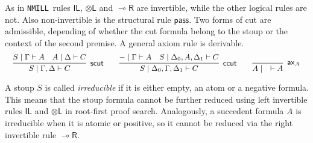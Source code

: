 \documentclass[runningheads]{llncs}
\newcommand{\tl}{\otimes \mathsf{L}}
\newcommand{\lright}{{\multimap}\mathsf{R}}
\newcommand{\pass}{\mathsf{pass}}
\newcommand{\unitl}{\mathsf{IL}}
\newcommand{\otL}{\tl}
\newcommand{\lolliR}{\lright}
\newcommand{\IL}{\unitl}
\newcommand{\ax}{\mathsf{ax}}
\newcommand{\NMILL}{\texttt{NMILL}}
\begin{document}
As in \NMILL\, rules $\IL$, $\otL$ and $\lolliR$ are invertible, while the other logical rules are not. Also non-invertible is the structural rule $\pass$.
Two forms of cut are admissible, depending of whether the cut formula belong to the stoup or the context of the second premise. A general axiom rule is derivable.
\[
\small
    \infer[\mathsf{scut}]{S \mid \Gamma , \Delta \vdash C}{
      S \mid \Gamma \vdash A
      &
      A \mid \Delta \vdash C
    }
    \qquad
    \infer[\mathsf{ccut}]{S \mid \Delta_0 , \Gamma , \Delta_1 \vdash C}{
      - \mid \Gamma \vdash A
      &
      S \mid \Delta_0 , A , \Delta_1 \vdash C
    }
    \qquad
    \infer[\ax_A]{A \mid \quad \vdash A}{}
\]

A stoup $S$ is called \emph{irreducible} if it is either empty, an atom or a negative formula. This means that the stoup formula cannot be further reduced using left invertible rules $\IL$ and $\otL$ in root-first proof search. Analogously, a succedent formula $A$ is irreducible when it is atomic or positive, so it cannot be reduced via the right invertible rule $\lolliR$.
\end{document}
